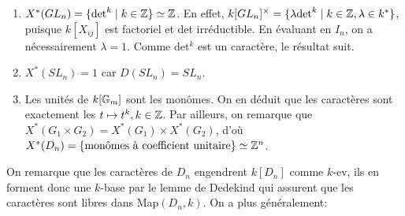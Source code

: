\begin{ex}
\begin{enumerate}
\item $X^*(GL_n)=\lbrace \textrm{det}^k\mid k\in \mathbb{Z} \rbrace\simeq\mathbb{Z}$. En effet, $k[GL_n]^\times =\lbrace \lambda\textrm{det}^k\mid k\in \mathbb{Z}, \lambda\in k^* \rbrace$, puisque $k[X_{ij}]$ est factoriel et det irréductible. En évaluant en $I_n$, on a nécessairement $\lambda=1$. Comme det$^k$ est un caractère, le résultat suit.
\item $X^*(SL_n)={1}$ car $D(SL_n)=SL_n$.
\item Les unités de $k[\mathbb{G}_m]$ sont les monômes. On en déduit que les caractères sont exactement les $t\mapsto t^k, k\in \mathbb{Z}$. Par ailleurs, on remarque que $X^*(G_1\times G_2)=X^*(G_1)\times X^*(G_2)$, d'où $X^*(D_n)=\lbrace \textrm{monômes à coefficient unitaire} \rbrace \simeq \mathbb{Z}^n$.
\end{enumerate}
\end{ex}

On remarque que les caractères de $D_n$ engendrent $k[D_n]$ comme $k$-ev, ils en forment donc une $k$-base par le lemme de Dedekind qui assurent que les caractères sont libres dans Map$(D_n, k)$. On a plus généralement:


